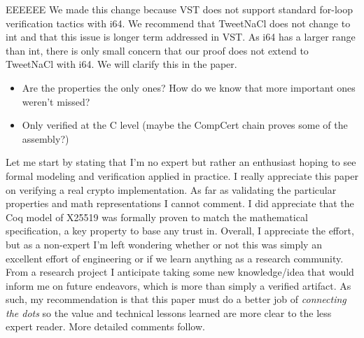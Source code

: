\begin{answer}{EEEEEE}
    We made this change because VST does not support standard for-loop
    verification tactics with i64. We recommend that TweetNaCl does not change to
    int and that this issue is longer term addressed in VST. As i64 has a larger
    range than int, there is only small concern that our proof does not extend to
    TweetNaCl with i64. We will clarify this in the paper.
\end{answer}

\begin{itemize}
    \item Are the properties the only ones? How do we know that more important ones weren’t missed?
    \item Only verified at the C level (maybe the CompCert chain proves some of the assembly?)
\end{itemize}


\begin{center}
\end{center}

Let me start by stating that I’m no expert but rather an enthusiast hoping to see formal modeling and verification applied in practice. I really appreciate this paper on verifying a real crypto implementation. As far as validating the particular properties and math representations I cannot comment. I did appreciate that the Coq model of X25519 was formally proven to match the mathematical specification, a key property to base any trust in. Overall, I appreciate the effort, but as a non-expert I’m left wondering whether or not this was simply an excellent effort of engineering or if we learn anything as a research community. From a research project I anticipate taking some new knowledge/idea that would inform me on future endeavors, which is more than simply a verified artifact. As such, my recommendation is that this paper must do a better job of \textit{connecting the dots} so the value and technical lessons learned are more clear to the less expert reader. More detailed comments follow.

